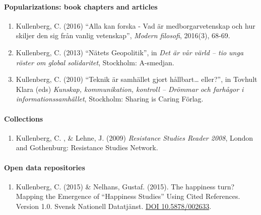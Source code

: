\documentclass[
]{article}
\providecommand{\tightlist}{%
  \setlength{\itemsep}{0pt}\setlength{\parskip}{0pt}}
\begin{document}
\hypertarget{popularizations-book-chapters-and-articles}{%
\paragraph{Popularizations: book chapters and
articles}\label{popularizations-book-chapters-and-articles}}

\begin{enumerate}
\def\labelenumi{\arabic{enumi}.}
\tightlist
\item
  Kullenberg, C. (2016) ``Alla kan forska - Vad är medborgarvetenskap
  och hur skiljer den sig från vanlig vetenskap'', \emph{Modern
  filosofi}, 2016(3), 68-69.
\item
  Kullenberg, C. (2013) ``Nätets Geopolitik'', in \emph{Det är vår värld
  -- tio unga röster om global solidaritet}, Stockholm: A-smedjan.
\item
  Kullenberg, C. (2010) ``Teknik är samhället gjort hållbart\ldots{}
  eller?'', in Tovhult Klara (eds) \emph{Kunskap, kommunikation,
  kontroll -- Drömmar och farhågor i informationssamhället}, Stockholm:
  Sharing is Caring Förlag.
\end{enumerate}

\hypertarget{collections}{%
\paragraph{Collections}\label{collections}}

\begin{enumerate}
\def\labelenumi{\arabic{enumi}.}
\tightlist
\item
  Kullenberg, C. , \& Lehne, J. (2009) \emph{Resistance Studies Reader
  2008}, London and Gothenburg: Resistance Studies Network.
\end{enumerate}

\hypertarget{open-data-repositories}{%
\paragraph{Open data repositories}\label{open-data-repositories}}

\begin{enumerate}
\def\labelenumi{\arabic{enumi}.}
\tightlist
\item
  Kullenberg, C. (2015) \& Nelhans, Gustaf. (2015). The happiness turn?
  Mapping the Emergence of ``Happiness Studies'' Using Cited References.
  Version 1.0. Svensk Nationell Datatjänst.
  \href{http://dx.doi.org/10.5878/002633}{DOI 10.5878/002633}.
\end{enumerate}
\end{document}
